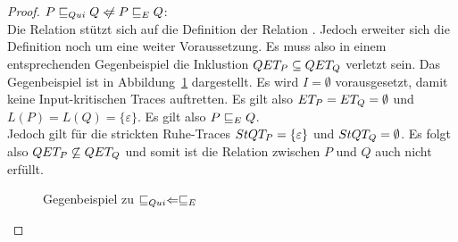 \begin{proof}
  $P \QRel Q \hspace{0.1cm}\not\hspace{-0.1cm}\Leftarrow P \ERel Q$:\\
  Die Relation \QRel{} stützt sich auf die Definition der Relation \ERel{}.
  Jedoch erweiter sich die Definition noch um eine weiter Voraussetzung. Es
  muss also in einem entsprechenden Gegenbeispiel die Inklustion $QET _P
  \subseteq QET _Q$ verletzt sein. Das Gegenbeispiel ist in
  Abbildung~\ref{QuiEGegenBsp} dargestellt. Es wird $I = \emptyset$
  vorausgesetzt, damit keine Input-kritischen Traces auftretten. Es gilt also
  $ET _P = ET _Q = \emptyset$ und $L(P) = L(Q) = \{\varepsilon\}$. Es gilt
  also $P \sqsubseteq  _E Q$.\\
  Jedoch gilt für die strickten Ruhe-Traces $StQT _P = \{\varepsilon\}$ und
  $StQT _Q = \emptyset$. Es folgt also $QET _P \not\subseteq QET _Q$ und
  somit ist die Relation \QRel{} zwischen $P$ und $Q$ auch nicht erfüllt.

  \begin{figure}[htbp]
    \begin{center}
      \caption{Gegenbeispiel zu $ \sqsubseteq  _{Qui} \Leftarrow  \sqsubseteq  _E$}
      \label{QuiEGegenBsp}
    \end{center}
  \end{figure}
\end{proof}
